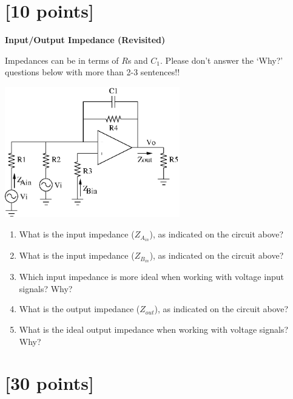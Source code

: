 \documentclass[12pt]{article}
\begin{document}


\clearpage



\section{[10 points]}

{\bf Input/Output Impedance (Revisited)}

Impedances can be in terms of $R$s and $C_1$.  Please don't answer the `Why?' questions below with more than 2-3 sentences!!

\begin{center}
\includegraphics[width=3.0in]{zin_zout.eps}
\end{center}

\begin{enumerate}
\item What is the input impedance ($Z_{A_{in}}$), as indicated on the circuit above?
\item What is the input impedance ($Z_{B_{in}}$), as indicated on the circuit above?
\item Which input impedance is more ideal when working with voltage input signals?  Why?
\item What is the output impedance ($Z_{out}$), as indicated on the circuit above?
\item What is the ideal output impedance when working with voltage signals?  Why?
\end{enumerate}

\clearpage



\clearpage



\section{[30 points]}
\end{document}
